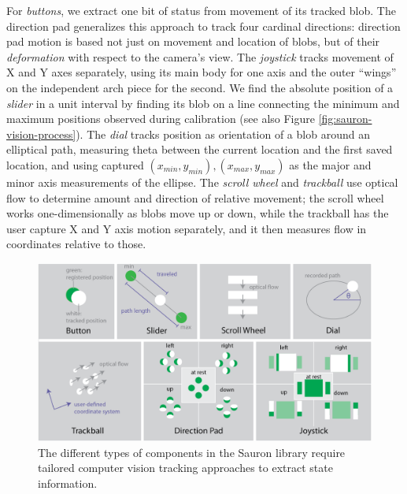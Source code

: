For {\em buttons}, we extract one bit of status from movement of its tracked blob. The direction pad generalizes this approach to track four cardinal directions: direction pad motion is based not just on movement and location of blobs, but of their \emph{deformation} with respect to the camera's view. The {\em joystick} tracks movement of X and Y axes separately, using its main body for one axis and the outer ``wings'' on the independent arch piece for the second. We find the absolute position of a {\em slider} in a unit interval by finding its blob on a line connecting the minimum and maximum positions observed during calibration (see also Figure \ref{fig:sauron-vision-process}). The {\em dial} tracks position as orientation of a blob around an elliptical path, measuring theta between the current location and the first saved location, and using captured $(x_{min}, y_{min}),(x_{max}, y_{max})$ as the major and minor axis measurements of the ellipse. The {\em scroll wheel} and {\em trackball} use optical flow to determine amount and direction of relative movement; the scroll wheel works one-dimensionally as blobs move up or down, while the trackball has the user capture X and Y axis motion separately, and it then measures flow in coordinates relative to those.

\begin{figure}
\centering
\includegraphics[width=\textwidth]{figures/sauron/vision-all-components.png}
\caption{The different types of components in the Sauron library require tailored computer vision tracking approaches to extract state information.}
\label{fig:sauron-vision}
\end{figure}

